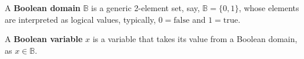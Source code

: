 \documentclass[12pt]{article}
\begin{document}

A \textbf{Boolean domain} $\mathbb{B}$ is a generic 2-element set, say, $\mathbb{B} = \{ 0, 1 \}$, whose elements are interpreted as logical values, typically, $0 = \mathrm{false}$ and $1 = \mathrm{true}$.

A \textbf{Boolean variable} $x$ is a variable that takes its value from a Boolean domain, as $x \in \mathbb{B}$.

\end{document}
